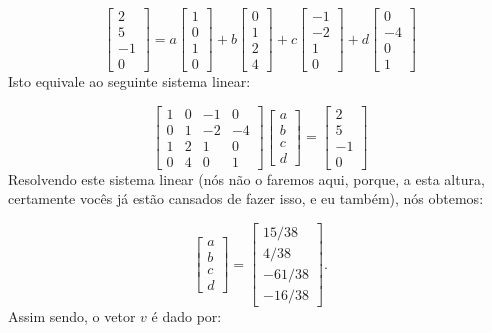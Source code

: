 \begin{Example}
	$$
	\begin{bmatrix}
		2 \\
		5 \\
		-1 \\
		0
	\end{bmatrix} = 
	a\begin{bmatrix}
		1 \\
		0 \\
		1 \\
		0
	\end{bmatrix} + b\begin{bmatrix}
		0 \\
		1 \\
		2 \\
		4
	\end{bmatrix} + c\begin{bmatrix}
		-1 \\
		-2 \\
		1 \\
		0
	\end{bmatrix} + d\begin{bmatrix}
		0 \\
		-4 \\
		0 \\
		1
	\end{bmatrix}
	$$
	Isto equivale ao seguinte sistema linear:
	
	$$
	\begin{bmatrix}
		1 & 0 & -1 & 0 \\
		0 & 1 & -2 & -4 \\
		1 & 2 & 1 & 0 \\
		0 & 4 & 0 & 1
	\end{bmatrix}
	\begin{bmatrix}
		a \\
		b \\
		c \\
		d
	\end{bmatrix}
	=
	\begin{bmatrix}
		2 \\
		5 \\
		-1 \\
		0
	\end{bmatrix}
	$$
	Resolvendo este sistema linear (nós não o faremos aqui, porque, a esta altura, certamente vocês já estão cansados de fazer isso, e eu também), nós obtemos:
	
	$$
	\begin{bmatrix}
		a \\
		b \\
		c \\
		d
	\end{bmatrix} = \begin{bmatrix}
		15/38 \\
		4/38 \\
		-61/38 \\
		-16/38
	\end{bmatrix}.
	$$
	Assim sendo, o vetor $v$ é dado por:
	

\end{Example}
